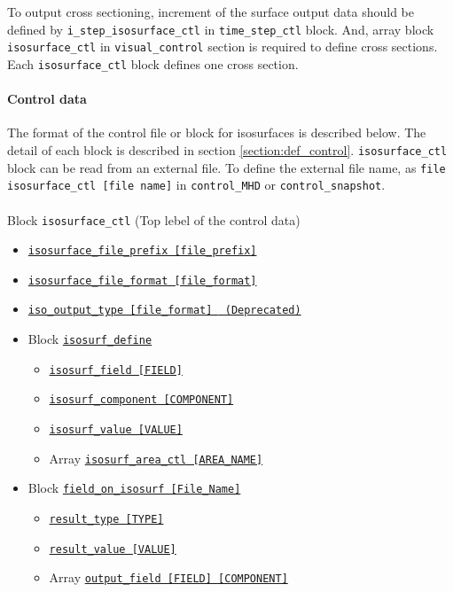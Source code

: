 To output cross sectioning, increment of the surface output data should be defined by \verb|i_step_isosurface_ctl| in \verb|time_step_ctl| block. And, array block \verb|isosurface_ctl| in \verb|visual_control| section is required to define cross sections. Each \verb|isosurface_ctl| block defines one cross section.
%
\paragraph{Control data}  \label{section:isosurface_control}
The format of the control file or block for isosurfaces is described below. The detail of each block is described in section \ref{section:def_control}.  \verb|isosurface_ctl| block can be read from an external file. To define the external file name, as \verb|file isosurface_ctl [file name]| in \verb|control_MHD| or \verb|control_snapshot|. \\
\\
%
Block \verb|isosurface_ctl|  (Top lebel of the control data)
\label{href_i:isosurface_ctl}
\begin{itemize}
	\item \hyperref[href_t:isosurface_file_prefix]
			{\tt isosurface\_file\_prefix    [file\_prefix]}
	\item \hyperref[href_t:isosurface_file_format]
			{\tt isosurface\_file\_format    [file\_format]}
    \item \hyperref[href_t:isosurface_file_format]
            {\tt iso\_output\_type           [file\_format] {\color{red} (Deprecated)}}
%
	\item Block \hyperref[href_t:isosurf_define]{\tt isosurf\_define}
		\begin{itemize}
			\item \hyperref[href_t:isosurf_field]{\tt isosurf\_field    [FIELD]}
			\item \hyperref[href_t:isosurf_component]
						{\tt isosurf\_component    [COMPONENT]}
			\item \hyperref[href_t:isosurf_value]{\tt isosurf\_value    [VALUE]}
%
			\item Array \hyperref[href_t:isosurf_area_ctl]
						{\tt isosurf\_area\_ctl  [AREA\_NAME]}
		\end{itemize}
%
	\item Block \hyperref[href_t:field_on_isosurf]{\tt field\_on\_isosurf    [File\_Name]}
		\begin{itemize}
			\item \hyperref[href_t:result_type]{\tt result\_type    [TYPE]}
			\item \hyperref[href_t:result_value]{\tt result\_value    [VALUE]}
			\item Array \hyperref[href_t:iso_output_field]
						{\tt output\_field        [FIELD]    [COMPONENT]}
		\end{itemize}
\end{itemize}

